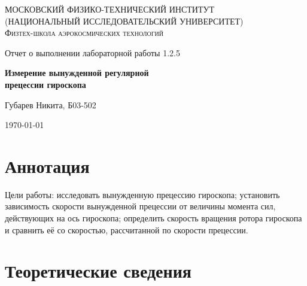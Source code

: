 \documentclass[a4paper]{article}
\begin{document}
	
	\begin{titlepage}
		\centering
		{\scshape\Large МОСКОВСКИЙ ФИЗИКО-ТЕХНИЧЕСКИЙ ИНСТИТУТ \\
			(НАЦИОНАЛЬНЫЙ ИССЛЕДОВАТЕЛЬСКИЙ УНИВЕРСИТЕТ)\\ %
			Физтех-школа аэрокосмических технологий}
		

		\vspace{4cm} %
		{\LARGE Отчет о выполнении лабораторной работы 1.2.5}

		\vspace{1cm} %
	{\huge\bf Измерение вынужденной регулярной \\прецессии гироскопа}
		
		\vspace{1cm} %
		\vfill %
		
		\begin{flushright} %
			{\LARGE Губарев Никита, Б03-502}
		\end{flushright}
		\vfill 
		\today %
	\end{titlepage}
\tableofcontents 
\section{Аннотация}
Цели работы: исследовать вынужденную прецессию гироскопа; установить зависимость скорости вынужденной прецессии от величины момента сил, действующих на ось гироскопа; определить скорость вращения ротора гироскопа и сравнить её со скоростью, рассчитанной по скорости прецессии.

\section{Теоретические сведения}
\end{document}
